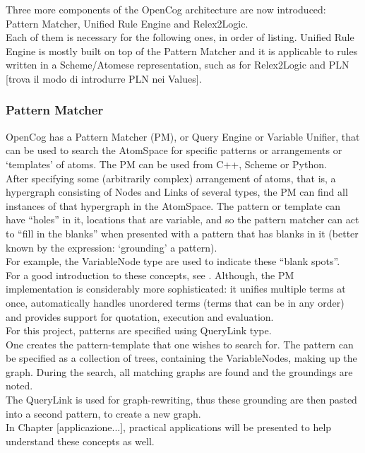 Three more components of the OpenCog architecture are now introduced: Pattern Matcher, Unified Rule Engine and Relex2Logic. \\
Each of them is necessary for the following ones, in order of listing.
Unified Rule Engine is mostly built on top of the Pattern Matcher and it is applicable to rules written in a Scheme/Atomese representation, such as for Relex2Logic and PLN [trova il modo di introdurre PLN nei Values].

\subsubsection{Pattern Matcher}\label{sec:pattern_matcher}

OpenCog has a Pattern Matcher (PM), or Query Engine or Variable Unifier, that can be used to search the AtomSpace for specific patterns or arrangements or `templates' of atoms. 
The PM can be used from C++, Scheme or Python. \\
After specifying some (arbitrarily complex) arrangement of atoms, that is, a hypergraph consisting of Nodes and Links of several types, the PM can find all instances of that hypergraph in the AtomSpace. The pattern or template can have \enquote{holes} in it, locations that are variable, and so the pattern matcher can act to \enquote{fill in the blanks} when presented with a pattern that has blanks in it (better known by the expression: `grounding' a pattern). \\
For example, the VariableNode type are used to indicate these \enquote{blank spots}. \\
For a good introduction to these concepts, see \cite{baader_nipkow_1998}. Although, the PM implementation is considerably more sophisticated: it unifies multiple terms at once, automatically handles unordered terms (terms that can be in any order) and provides support for quotation, execution and evaluation. \\

For this project, patterns are specified using QueryLink type. \\
One creates the pattern-template that one wishes to search for. The pattern can be specified as a collection of trees, containing the VariableNodes, making up the graph. 
During the search, all matching graphs are found and the groundings are noted. \\
The QueryLink is used for graph-rewriting, thus these grounding are then pasted into a second pattern, to create a new graph. \\
In Chapter [applicazione...], practical applications will be presented to help understand these concepts as well.

